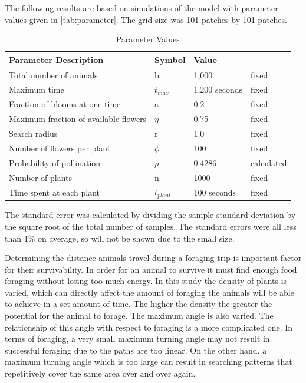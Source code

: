 The following results are based on simulations of the model with parameter values given in
\autoref{tab:parameter}.  The grid size was 101 patches by 101 patches.

\begin{table}
  \begin{tabular}{|l|l|l|l|}
    \hline
    Parameter Description & Symbol & Value &  \\ \hline  \label{parameter}
    Total number of animals & b & 1,000 & fixed  \\ \hline
    Maximum time & $t_{max}$ & 1,200 seconds & fixed \\ \hline
    Fraction of blooms at one time & a & 0.2 & fixed \\ \hline
    Maximum fraction of available flowers & $\eta$ & 0.75 & fixed \\ \hline
    Search radius & r & 1.0 & fixed \\ \hline
    Number of flowers per plant & $\phi$ & 100 & fixed \\ \hline
    Probability of pollination   & $\rho$ & 0.4286 & calculated \\ \hline
    Number of plants & n & 1000 & fixed \\ \hline
    Time spent at each plant & $t_{plant}$ & 100 seconds & fixed \\ \hline
  \end{tabular}
  \caption{Parameter Values}
  \label{tab:parameter}
\end{table}

The standard error was calculated by dividing the sample standard deviation by the square root of
the total number of samples.   The standard errors were all less than 1\% on average, so will not be
shown due to the small size.

Determining the distance animals travel during a foraging trip is important factor for their
survivability.  In order for an animal to survive it must find enough food foraging without losing
too much energy.  In this study the density of plants is varied, which can directly affect the
amount of foraging the animals will be able to achieve in a set amount of time.  The higher the
density the greater the potential for the animal to forage.  The maximum angle is also varied.  The
relationship of this angle with respect to foraging is a more complicated one.  In terms of
foraging, a very small maximum turning angle may not result in successful foraging due to the paths
are too linear.  On the other hand, a maximum turning angle which is too large can result in
searching patterns that repetitively cover the same area over and over again.


